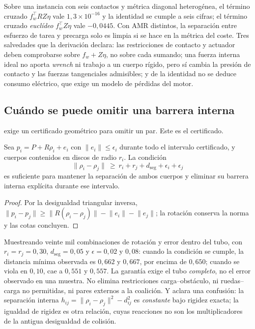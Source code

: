 \begin{observacion}
\label{obs:metrica-R}
Sobre una instancia con seis contactos y métrica diagonal heterogénea, el
término cruzado $f_w^{\!\top}RZ\eta$ vale $1{,}3\times10^{-16}$ y la identidad
se cumple a seis cifras; el término cruzado \emph{euclídeo} $f_w^{\!\top}Z\eta$
vale $-0{,}0445$. Con AMR distintos, la separación entre esfuerzo de tarea y
precarga solo es limpia si se hace en la métrica del coste. Tres salvedades que
la derivación declara: las restricciones de contacto y actuador deben
comprobarse sobre $f_w+Z\eta$, no sobre cada sumando; una fuerza interna ideal
no aporta \emph{wrench} ni trabajo a un cuerpo rígido, pero sí cambia la presión
de contacto y las fuerzas tangenciales admisibles; y de la identidad no se
deduce consumo eléctrico, que exige un modelo de pérdidas del motor.
\end{observacion}

\subsection{Cuándo se puede omitir una barrera interna}

 exige un certificado geométrico para omitir un par.
Este es el certificado.

\begin{proposicion}
\label{pr:tubo}
Sea $p_i=P+R\rho_i+e_i$ con $\lVert e_i\rVert\le\epsilon_i$ durante todo el
intervalo certificado, y cuerpos contenidos en discos de radio $r_i$. La
condición
\[
  \lVert\rho_i-\rho_j\rVert\ \ge\ r_i+r_j+d_{\mathrm{seg}}+\epsilon_i+\epsilon_j
\]
es suficiente para mantener la separación de ambos cuerpos y eliminar su
barrera interna explícita durante ese intervalo.
\end{proposicion}

\begin{proof}
Por la desigualdad triangular inversa,
$\lVert p_i-p_j\rVert\ge\lVert R(\rho_i-\rho_j)\rVert-\lVert e_i\rVert-\lVert e_j\rVert$;
la rotación conserva la norma y las cotas concluyen.
\end{proof}

\begin{observacion}
\label{obs:tubo-num}
Muestreando veinte mil combinaciones de rotación y error dentro del tubo, con
$r_i=r_j=0{,}30$, $d_{\mathrm{seg}}=0{,}05$ y $\epsilon=0{,}02$ y $0{,}08$: cuando
la condición se cumple, la distancia mínima observada es $0{,}662$ y $0{,}667$,
por encima de $0{,}650$; cuando se viola en $0{,}10$, cae a $0{,}551$ y
$0{,}557$. La garantía exige el tubo \emph{completo}, no el error observado en
una muestra. No elimina restricciones carga–obstáculo, ni ruedas–carga no
permitidas, ni pares externos a la coalición. Y aclara una confusión: la
separación interna $h_{ij}=\lVert\rho_i-\rho_j\rVert^{2}-d_{ij}^{2}$ es
\emph{constante} bajo rigidez exacta; la igualdad de rigidez es otra relación,
cuyas reacciones no son los multiplicadores de la antigua desigualdad de
colisión.
\end{observacion}

